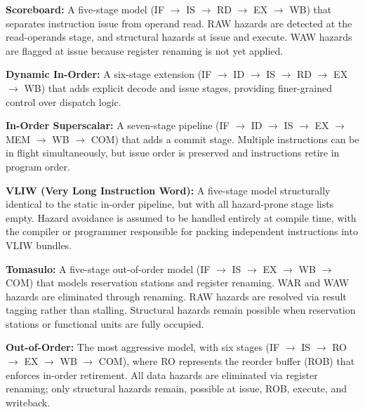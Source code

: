 \textbf{Scoreboard:} A five-stage model (IF $\to$ IS $\to$ RD $\to$ EX $\to$ WB) that separates instruction issue from operand read. RAW hazards are detected at the read-operands stage, and structural hazards at issue and execute. WAW hazards are flagged at issue because register renaming is not yet applied.

\textbf{Dynamic In-Order:} A six-stage extension (IF $\to$ ID $\to$ IS $\to$ RD $\to$ EX $\to$ WB) that adds explicit decode and issue stages, providing finer-grained control over dispatch logic.

\textbf{In-Order Superscalar:} A seven-stage pipeline (IF $\to$ ID $\to$ IS $\to$ EX $\to$ MEM $\to$ WB $\to$ COM) that adds a commit stage. Multiple instructions can be in flight simultaneously, but issue order is preserved and instructions retire in program order.

\textbf{VLIW (Very Long Instruction Word):} A five-stage model structurally identical to the static in-order pipeline, but with all hazard-prone stage lists empty. Hazard avoidance is assumed to be handled entirely at compile time, with the compiler or programmer responsible for packing independent instructions into VLIW bundles.

\textbf{Tomasulo:} A five-stage out-of-order model (IF $\to$ IS $\to$ EX $\to$ WB $\to$ COM) that models reservation stations and register renaming. WAR and WAW hazards are eliminated through renaming. RAW hazards are resolved via result tagging rather than stalling. Structural hazards remain possible when reservation stations or functional units are fully occupied.

\textbf{Out-of-Order:} The most aggressive model, with six stages (IF $\to$ IS $\to$ RO $\to$ EX $\to$ WB $\to$ COM), where RO represents the reorder buffer (ROB) that enforces in-order retirement. All data hazards are eliminated via register renaming; only structural hazards remain, possible at issue, ROB, execute, and writeback.